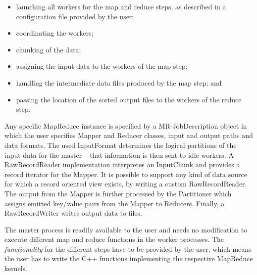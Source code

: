 \documentclass[3p,twocolumn]{elsarticle}
\begin{document}
\begin{itemize}
 \vspace*{-0.5em}
 \setlength{\itemsep}{-.1em}


 \item launching all workers for the map and reduce steps, as
 described in a configuration file provided by the user; 
 \item coordinating the workers;
 \item chunking of the data;
 \item assigning the
 input data to the workers of the map step;
 \item handling the intermediate
 data files produced by the map step; and
 \item passing the location of the
 sorted output files to the workers of the reduce step.


 \vspace*{-0.5em}
\end{itemize}

Any specific MapReduce instance
is specified by a MR-JobDescription object in which the user specifies 
Mapper and Reducer classes, input and output paths and data formats.  The
used InputFormat determines the logical partitions of the input data for
the master -- that information is then sent to idle workers.  A
Raw\-Record\-Reader implementation interpretes an
InputChunk and provides a record iterator for the Mapper. It is
possible to support any kind of data source for which a record
oriented view exists, by writing a custom Raw\-Record\-Reader.
The output from the Mapper is further processed by the Partitioner
which assigns emitted key/value pairs from the Mapper to Reducers.
Finally, a Raw\-Record\-Writer writes output data to files.

The master process is readily available to the user and needs no
modification to execute different map and reduce functions in the
worker processes.
The \textit{functionality} for the different steps have to be provided by
the user, which means the user has to write the C++ functions
implementing the respective MapReduce kernels.
\end{document}
